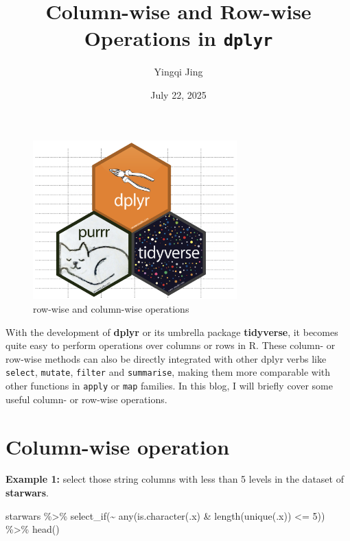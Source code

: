 \documentclass[
  letterpaper,
  DIV=11,
  numbers=noendperiod]{scrartcl}
\title{Column-wise and Row-wise Operations in \texttt{dplyr}}
\author{Yingqi Jing}
\date{July 22, 2025}
\newenvironment{Shaded}{}{}
\newcommand{\DecValTok}[1]{\textcolor[rgb]{0.60,0.41,0.00}{#1}}
\newcommand{\FunctionTok}[1]{\textcolor[rgb]{0.25,0.47,0.95}{#1}}
\newcommand{\NormalTok}[1]{\textcolor[rgb]{0.22,0.23,0.26}{#1}}
\newcommand{\SpecialCharTok}[1]{\textcolor[rgb]{0.00,0.52,0.74}{#1}}
\renewcommand*\contentsname{Table of contents}
\newcommand\contentsname{Table of contents}
\begin{document}
\maketitle

\renewcommand*\contentsname{Contents}
{
\hypersetup{linkcolor=}
\setcounter{tocdepth}{4}
\tableofcontents
}
\listoffigures
\listoftables

\clearpage

\begin{figure}[H]

{\centering \includegraphics[width=0.7\textwidth,height=0.7\textheight]{logos/dplyrlogs.png}

}

\caption{row-wise and column-wise operations}

\end{figure}%

With the development of \textbf{dplyr} or its umbrella package
\textbf{tidyverse}, it becomes quite easy to perform operations over
columns or rows in R. These column- or row-wise methods can also be
directly integrated with other dplyr verbs like \texttt{select},
\texttt{mutate}, \texttt{filter} and \texttt{summarise}, making them
more comparable with other functions in \texttt{apply} or \texttt{map}
families. In this blog, I will briefly cover some useful column- or
row-wise operations.

\section{Column-wise operation}\label{column-wise-operation}

\textbf{Example 1:} select those string columns with less than 5 levels
in the dataset of \textbf{starwars}.

\begin{Shaded}
\begin{Highlighting}[]
\NormalTok{starwars }\SpecialCharTok{\%\textgreater{}\%}
  \FunctionTok{select\_if}\NormalTok{(}\SpecialCharTok{\textasciitilde{}} \FunctionTok{any}\NormalTok{(}\FunctionTok{is.character}\NormalTok{(.x) }\SpecialCharTok{\&} \FunctionTok{length}\NormalTok{(}\FunctionTok{unique}\NormalTok{(.x)) }\SpecialCharTok{\textless{}=} \DecValTok{5}\NormalTok{)) }\SpecialCharTok{\%\textgreater{}\%} 
  \FunctionTok{head}\NormalTok{()}
\end{Highlighting}
\end{Shaded}
\end{document}
